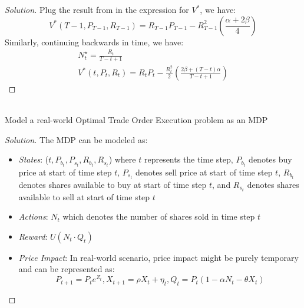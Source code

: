 \documentclass[12pt]{article}
\newenvironment{problem}[2][Problem]{\begin{trivlist}
\item[\hskip \labelsep {\bfseries #1}\hskip \labelsep {\bfseries #2.}]}{\end{trivlist}}
\newenvironment{solution}
  {\renewcommand\qedsymbol{$\blacksquare$}\begin{proof}[Solution]}
  {\end{proof}}
\begin{document}
\begin{solution}
Plug the result from  in the expression for $V^*$, we have:
\begin{equation}
V^{*}\left(T-1, P_{T-1}, R_{T-1}\right)=R_{T-1} P_{T-1}-R_{T-1}^{2}\left(\frac{\alpha+2 \beta}{4}\right)
\end{equation}
Similarly, continuing backwards in time, we have:
\begin{equation}
\begin{array}{c}
N_{t}^{\star}=\frac{R_{t}}{T-t+1} \\
V^{*}\left(t, P_{t}, R_{t}\right)=R_{t} P_{t}-\frac{R_{t}^{2}}{2}\left(\frac{2 \beta+(T-t) \alpha}{T-t+1}\right)
\end{array}
\end{equation}
\end{solution}

\begin{problem}{2}
	\text{ }\\
Model a real-world Optimal Trade Order Execution problem as an MDP
\end{problem}

\begin{solution}
The \gls{MDP} can be modeled as:
\begin{itemize}[noitemsep]
	\item \textit{States}: ($t, P_{b_t}, P_{s_t}, R_{b_t}, R_{s_t}$) where $t$ represents the time step, $P_{b_t}$ denotes buy price at start of time step $t$, $P_{s_t}$ denotes sell price at start of time step $t$, $R_{b_t}$ denotes shares available to buy at start of time step $t$, and $R_{s_t}$ denotes shares available to sell at start of time step $t$
	\item \textit{Actions}: $N_t$ which denotes the number of shares sold in time step $t$
	\item \textit{Reward}: $U(N_t \cdot Q_t)$
	\item \textit{Price Impact}: In real-world scenario, price impact might be purely temporary and can be represented as:
	\begin{equation}
	P_{t+1}=P_{t} e^{Z_{t}}, X_{t+1}=\rho X_{t}+\eta_{t}, Q_{t}=P_{t}\left(1-\alpha N_{t}-\theta X_{t}\right)
	\end{equation}
\end{itemize}
\end{solution}
\end{document}
